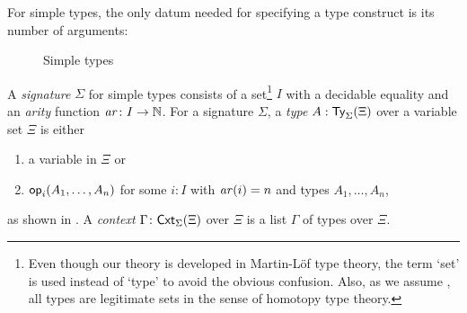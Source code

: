 For simple types, the only datum needed for specifying a type construct is its number of arguments:
\begin{definition} \label{def:simple-signature}
  \begin{figure}
      \centering
      \small
      \caption{Simple types}
      \label{fig:simple-type}
  \end{figure}
  A \emph{signature} $\Sigma$ for simple types consists of a set\footnote{%
    Even though our theory is developed in Martin-L\"of type theory, the term `set' is used instead of `type' to avoid the obvious confusion. 
    Also, as we assume \AxiomK, all types are legitimate sets in the sense of homotopy type theory.
  }
  $I$ with a decidable equality and an \emph{arity} function $\mathit{ar}\colon I \to \mathbb{N}$.
  For a signature $\Sigma$, a \emph{type} $A : \mathsf{Ty}_{\Sigma}(\Xi)$ over a variable set $\Xi$ is either
  \begin{enumerate}
    \item a variable in $\Xi$ or
    \item $\mathsf{op}_{i}(A_1, \ldots, A_n)$ for some $i:I$ with $\mathit{ar}(i) = n$ and types $A_1,\ldots, A_n$,
  \end{enumerate}
  as shown in .
  A \emph{context} $\Gamma \colon \mathsf{Cxt}_{\Sigma}(\Xi)$ over $\Xi$ is a list $\Gamma$ of types over $\Xi$. 
\end{definition}

